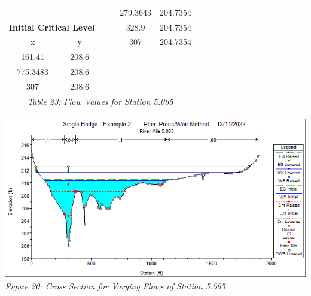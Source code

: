 \begin{center}
\begin{tabular}{|cc|cc|cc|}
                         &                                              &          &                                          & 279.3643 & 204.7354                                         \\
                \multicolumn{2}{|c|}{\textbf{Initial Critical Level}}   &          &                                          & 328.9    & 204.7354                                         \\ 
                \cline{1-2}
                x        & y                                            &          &                                          & 307      & 204.7354                                         \\
                161.41   & 208.6                                        &          &                                          &          &                                                  \\
                775.3483 & 208.6                                        &          &                                          &          &                                                  \\
                307      & 208.6                                        &          &                                          &          &                                                  \\
                \hline\multicolumn{6}{c}{\emph{Table 23: Flow Values for Station 5.065}}
                \end{tabular}
                \vspace{5mm}
                \begin{center}
                    \includegraphics[scale=0.7, frame]{fig20.png}
                    \\\emph{Figure 20: Cross Section for Varying Flows of Station 5.065}\\
                \end{center}
\end{center}